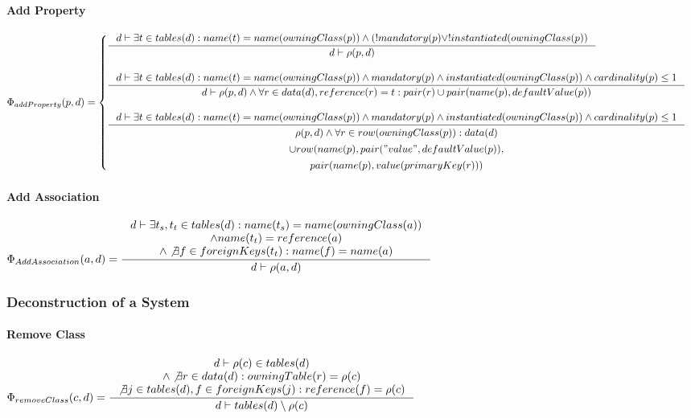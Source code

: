 \documentclass[11pt]{article}
\begin{document}
\paragraph{Add Property}
$
\Phi_{addProperty}(p, d) = \begin{cases}
\inference{d \vdash \exists t \in tables(d) : name(t) = name(owningClass(p)) \wedge (! mandatory(p) \vee ! instantiated(owningClass(p))}{d \vdash \rho(p,d)} 
\\ \\ 
\inference{d \vdash \exists t \in tables(d) : name(t) = name(owningClass(p)) \wedge mandatory(p) \wedge instantiated(owningClass(p)) \wedge cardinality(p) \leq 1}{d \vdash \rho(p,d) \wedge \forall r \in data(d), reference(r) = t : pair(r) \cup pair(name(p), defaultValue(p))} 
\\ \\
\inference{d \vdash \exists t \in tables(d) : name(t) = name(owningClass(p)) \wedge mandatory(p) \wedge instantiated(owningClass(p)) \wedge cardinality(p) \leq 1}{\begin{gathered}
 \rho(p,d) \wedge \forall r \in row(owningClass(p)) : data(d)\\ \cup row(name(p), pair("value", defaultValue(p)), \\ pair(name(p), value(primaryKey(r))) 
\end{gathered}
} 

\end{cases}
$

\paragraph{Add Association}
$
\Phi_{AddAssociation}(a, d) = \inference{d \vdash \exists t_s, t_t \in tables(d) : name(t_s) = name(owningClass(a)) \\ \wedge name(t_t) = reference(a) \\ \wedge \not \exists f \in foreignKeys(t_t) : name(f) = name(a) }{d \vdash \rho(a,d)}
$


\subsubsection{Deconstruction of a System}
\paragraph{Remove Class}
$
\Phi_{removeClass}(c,d) = \inference{d \vdash \rho(c) \in tables(d) \\ \wedge \not \exists r \in data(d) : owningTable(r) = \rho(c) \\ \not \exists j \in tables(d), f \in foreignKeys(j) : reference(f) = \rho(c)  }{d \vdash tables(d) \setminus \rho(c)}
$
\end{document}
